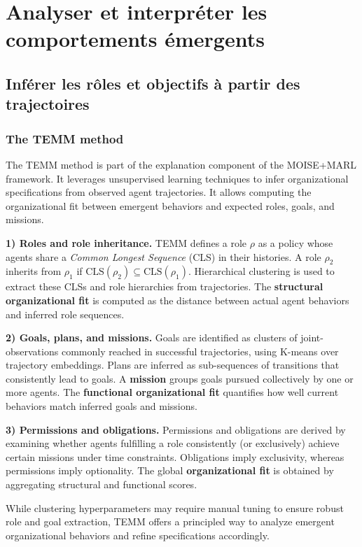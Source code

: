 \chapter{Analyser et interpréter les comportements émergents}
\section{Inférer les rôles et objectifs à partir des trajectoires}


\subsection{The TEMM method}
\label{sec:TEMM_algorithm}

The TEMM method is part of the explanation component of the MOISE+MARL framework. It leverages unsupervised learning techniques to infer organizational specifications from observed agent trajectories. It allows computing the organizational fit between emergent behaviors and expected roles, goals, and missions.

\textbf{1) Roles and role inheritance.} \quad TEMM defines a role $\rho$ as a policy whose agents share a \textit{Common Longest Sequence} (CLS) in their histories. A role $\rho_2$ inherits from $\rho_1$ if $\text{CLS}(\rho_2) \subseteq \text{CLS}(\rho_1)$. Hierarchical clustering is used to extract these CLSs and role hierarchies from trajectories. The \textbf{structural organizational fit} is computed as the distance between actual agent behaviors and inferred role sequences.

\textbf{2) Goals, plans, and missions.} \quad Goals are identified as clusters of joint-observations commonly reached in successful trajectories, using K-means over trajectory embeddings. Plans are inferred as sub-sequences of transitions that consistently lead to goals. A \textbf{mission} groups goals pursued collectively by one or more agents. The \textbf{functional organizational fit} quantifies how well current behaviors match inferred goals and missions.

\textbf{3) Permissions and obligations.} \quad Permissions and obligations are derived by examining whether agents fulfilling a role consistently (or exclusively) achieve certain missions under time constraints. Obligations imply exclusivity, whereas permissions imply optionality. The global \textbf{organizational fit} is obtained by aggregating structural and functional scores.

While clustering hyperparameters may require manual tuning to ensure robust role and goal extraction, TEMM offers a principled way to analyze emergent organizational behaviors and refine specifications accordingly.


